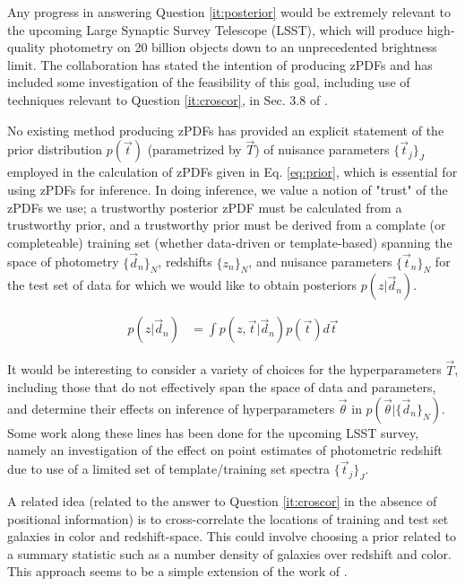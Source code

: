 \documentclass[12pt, onecolumn]{emulateapj}
\begin{document}
Any progress in answering Question \ref{it:posterior} would be extremely relevant to the upcoming Large Synaptic Survey Telescope (LSST), which will produce high-quality photometry on 20 billion objects down to an unprecedented brightness limit.  The collaboration has stated the intention of producing zPDFs and has included some investigation of the feasibility of this goal, including use of techniques relevant to Question \ref{it:croscor}, in Sec. 3.8 of \citet{abe09}.

No existing method producing zPDFs has provided an explicit statement of the prior distribution $p(\vec{t})$ (parametrized by $\vec{T}$) of nuisance parameters $\{\vec{t}_{j}\}_{J}$ employed in the calculation of zPDFs given in Eq. \ref{eq:prior}, which is essential for using zPDFs for inference.  In doing inference, we value a notion of "trust" of the zPDFs we use; a trustworthy posterior zPDF must be calculated from a trustworthy prior, and a trustworthy prior must be derived from a complate (or completeable) training set (whether data-driven or template-based) spanning the space of photometry $\{\vec{d}_{n}\}_{N}$, redshifts $\{z_{n}\}_{N}$, and nuisance parameters $\{\vec{t}_{n}\}_{N}$ for the test set of data for which we would like to obtain posteriors $p(z|\vec{d}_{n})$.  

\begin{align}
\label{eq:prior}
p(z|\vec{d}_{n}) &= \int p(z,\vec{t}|\vec{d}_{n})p(\vec{t})d\vec{t}
\end{align}

It would be interesting to consider a variety of choices for the hyperparameters $\vec{T}$, including those that do not effectively span the space of data and parameters, and determine their effects on inference of hyperparameters $\vec{\theta}$ in $p(\vec{\theta}|\{\vec{d}_{n}\}_{N})$.  Some work along these lines has been done for the upcoming LSST survey, namely an investigation of the effect on point estimates of photometric redshift due to use of a limited set of template/training set spectra $\{\vec{t}_{j}\}_{J}$.  \citep{abe09}

A related idea (related to the answer to Question \ref{it:croscor} in the absence of positional information) is to cross-correlate the locations of training and test set galaxies in color and redshift-space.  This could involve choosing a prior related to a summary statistic such as a number density of galaxies over redshift and color.  This approach seems to be a simple extension of the work of \citet{she11}.
\end{document}
